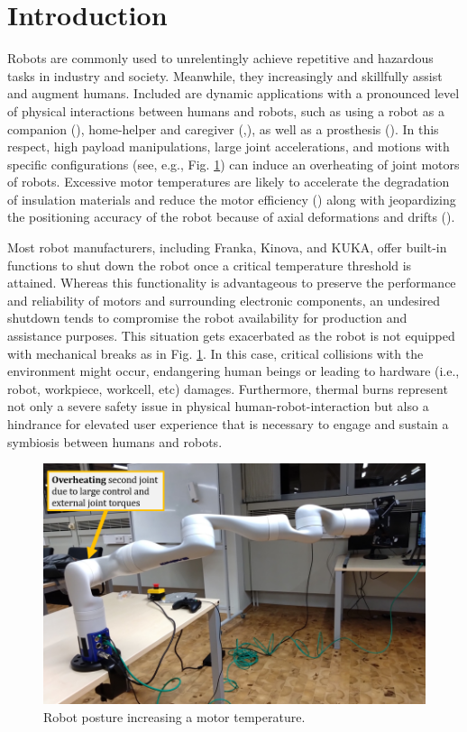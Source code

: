 \documentclass{ifacconf}
\begin{document}
\section{Introduction}
Robots are commonly used to unrelentingly achieve repetitive and hazardous tasks in industry and society. Meanwhile, they increasingly and skillfully assist and augment humans. Included are dynamic applications with a pronounced level of physical interactions between humans and robots, such as using a robot as a companion (\cite{basha2025robotic}), home-helper and caregiver (\cite{tsui2025exploring},\cite{gkiolnta2025challenges}), as well as a prosthesis (\cite{kim2025mode}). In this respect, high payload manipulations, large joint accelerations, and motions with specific configurations (see, e.g., Fig. \ref{fig:intro}) can induce an overheating of  joint motors of robots. Excessive motor temperatures are likely to accelerate the degradation of insulation materials and reduce the motor efficiency (\cite{yehorov2025study}) along with jeopardizing the positioning accuracy of the robot because of axial  deformations and drifts (\cite{soga2024skillful}). 



Most robot manufacturers, including Franka, Kinova, and KUKA, offer built-in functions to shut down the robot once a critical temperature threshold is attained. Whereas this functionality is advantageous to preserve the performance and reliability of motors and surrounding electronic components, an undesired shutdown tends to compromise the robot availability for production and assistance purposes. This situation gets exacerbated as the robot is not equipped with mechanical breaks as in Fig. \ref{fig:intro}. In this case, critical collisions with the environment might occur, endangering human beings or leading to hardware (i.e., robot, workpiece, workcell, etc) damages. Furthermore, thermal burns represent  not only  a severe safety issue in physical human-robot-interaction but also a hindrance for elevated user experience that is necessary to engage and sustain a symbiosis between humans and robots.

\begin{figure}[t]
	\centerline{\includegraphics[width=0.97\columnwidth]{pictures/intro.png}}
	\caption{Robot posture increasing a motor temperature.}
	\label{fig:intro}
\end{figure}
\end{document}
